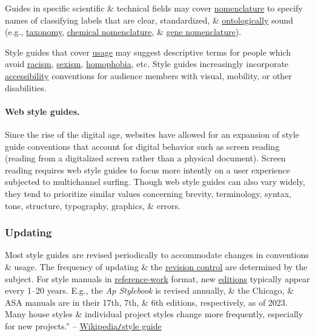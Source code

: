 \documentclass{article}
\begin{document}
Guides in specific scientific \& technical fields may cover \href{https://en.wikipedia.org/wiki/Nomenclature}{nomenclature} to specify names of classifying labels that are clear, standardized, \& \href{https://en.wikipedia.org/wiki/Ontology}{ontologically} sound (e.g., \href{https://en.wikipedia.org/wiki/Taxonomy_(biology)}{taxonomy}, \href{https://en.wikipedia.org/wiki/Chemical_nomenclature}{chemical nomenclature}, \& \href{https://en.wikipedia.org/wiki/Gene_nomenclature}{gene nomenclature}).

Style guides that cover \href{https://en.wikipedia.org/wiki/Usage_(language)}{usage} may suggest descriptive terms for people which avoid \href{https://en.wikipedia.org/wiki/Racism}{racism}, \href{https://en.wikipedia.org/wiki/Sexism}{sexism}, \href{https://en.wikipedia.org/wiki/Homophobia}{homophobia}, etc. Style guides increasingly incorporate \href{https://en.wikipedia.org/wiki/Accessibility}{accessibility} conventions for audience members with visual, mobility, or other disabilities.

\paragraph{Web style guides.} Since the rise of the digital age, websites have allowed for an expansion of style guide conventions that account for digital behavior such as screen reading (reading from a digitalized screen rather than a physical document). Screen reading requires web style guides to focus more intently on a user experience subjected to multichannel surfing. Though web style guides can also vary widely, they tend to prioritize similar values concerning brevity, terminology, syntax, tone, structure, typography, graphics, \& errors.

\subsubsection{Updating}
Most style guides are revised periodically to accommodate changes in conventions \& usage. The frequency of updating \& the \href{https://en.wikipedia.org/wiki/Revision_control}{revision control} are determined by the subject. For style manuals in \href{https://en.wikipedia.org/wiki/Reference_work}{reference-work} format, new \href{https://en.wikipedia.org/wiki/Edition_(book)}{editions} typically appear every 1--20 years. E.g., the {\it Ap Stylebook} is revised annually, \& the Chicago, \& ASA manuals are in their 17th, 7th, \& 6th editions, respectively, as of 2023. Many house styles \& individual project styles change more frequently, especially for new projects.'' -- \href{https://en.wikipedia.org/wiki/Style_guide}{Wikipedia{\tt/}style guide}
\end{document}
